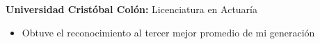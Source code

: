 %
%
%


\begin{scholarship}
					{\textbf{Universidad Cristóbal Colón:} Licenciatura en Actuaría
					\begin{itemize}
						\item Obtuve el reconocimiento al tercer mejor promedio de mi generación
					\end{itemize}
					} 
\end{scholarship}